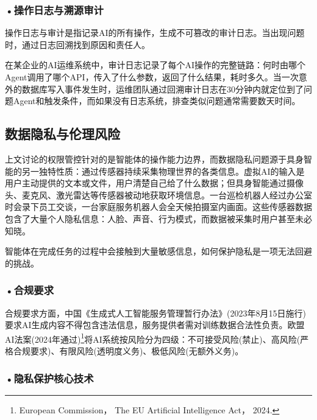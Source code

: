

\subsubsection*{\textbf{•操作日志与溯源审计}}
操作日志与审计是指记录AI的所有操作，生成不可篡改的审计日志。当出现问题时，通过日志回溯找到原因和责任人。

在某企业的AI运维系统中，审计日志记录了每个AI操作的完整链路：何时由哪个Agent调用了哪个API，传入了什么参数，返回了什么结果，耗时多久。当一次意外的数据库写入事件发生时，运维团队通过回溯审计日志在30分钟内就定位到了问题Agent和触发条件，而如果没有日志系统，排查类似问题通常需要数天时间。

\subsection{数据隐私与伦理风险}

上文讨论的权限管控针对的是智能体的操作能力边界，而数据隐私问题源于具身智能的另一独特性质：通过传感器持续采集物理世界的各类信息。虚拟AI的输入是用户主动提供的文本或文件，用户清楚自己给了什么数据；但具身智能通过摄像头、麦克风、激光雷达等传感器被动地获取环境信息。一台巡检机器人经过办公室时会录下员工交谈，一台家庭服务机器人会全天候拍摄室内画面。这些传感器数据包含了大量个人隐私信息：人脸、声音、行为模式，而数据被采集时用户甚至未必知晓。

智能体在完成任务的过程中会接触到大量敏感信息，如何保护隐私是一项无法回避的挑战。


\subsubsection*{\textbf{•合规要求}}

合规要求方面，中国《生成式人工智能服务管理暂行办法》(2023年8月15日施行)要求AI生成内容不得包含违法信息，服务提供者需对训练数据合法性负责。欧盟AI法案(2024年通过)\footnote{European Commission， The EU Artificial Intelligence Act， 2024.}将AI系统按风险分为四级：不可接受风险(禁止)、高风险(严格合规要求)、有限风险(透明度义务)、极低风险(无额外义务)。


\subsubsection*{\textbf{•隐私保护核心技术}}

